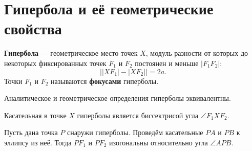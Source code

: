 \section{Гипербола и её геометрические свойства}

\begin{definition}
    \textbf{Гипербола} --- геометрическое место точек $X$, модуль разности от которых до некоторых фиксированных точек $F_1$ и $F_2$ постоянен и меньше $|F_1F_2|$:
    $$
    \big||XF_1| - |XF_2|\big| = 2a.
    $$
    Точки $F_1$ и $F_2$ называются \textbf{фокусами} гиперболы.
\end{definition}

\begin{statement}
    Аналитическое и геометрическое определения гиперболы эквивалентны.
\end{statement}

\begin{theorem}
    Касательная в точке $X$ гиперболы является биссектрисой угла $\angle F_1XF_2$.
\end{theorem}

\begin{theorem}
    Пусть дана точка $P$ снаружи гиперболы. Проведём касательные $PA$ и $PB$ к эллипсу из неё. Тогда $PF_1$ и $PF_2$ изогональны относительно угла $\angle APB$.
\end{theorem}


